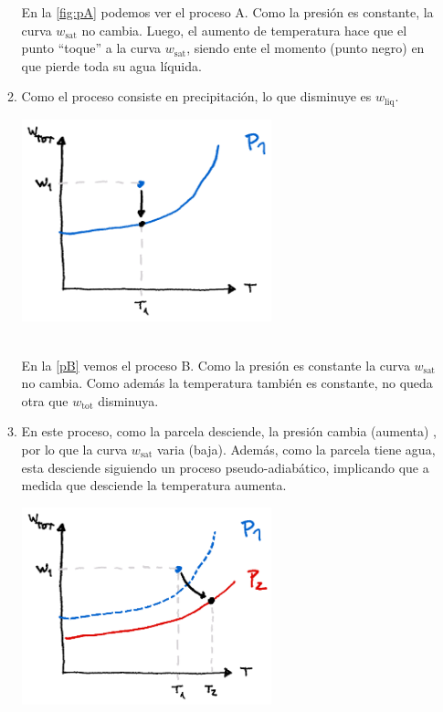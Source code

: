 \documentclass[../main.tex]{subfiles}
\begin{document}
\begin{enumerate}[a)]
\begin{enumerate}
            En la \autoref{fig:pA} podemos ver el proceso A. Como la presión es constante, la curva $w_\text{sat}$ no cambia. Luego, el aumento de temperatura hace que el punto ``toque'' a la curva $w_\text{sat}$, siendo ente el momento (punto negro) en que pierde toda su agua líquida.
            \newpage
        \item Como el proceso consiste en precipitación, lo que disminuye es  $w_\text{liq}$.\par
            \begin{minipage}{\linewidth}
                \centering  
                \includegraphics[width=0.6\textwidth]{img/procesoB}
                \label{pB}
            \end{minipage}\\

            En la \autoref{pB} vemos el proceso B. Como la presión es constante la curva $w_\text{sat}$ no cambia. Como además la temperatura también es constante, no queda otra que $w_\text{tot}$ disminuya. 
        \item En este proceso, como la parcela desciende, la presión cambia (aumenta) , por lo que la curva $w_\text{sat}$ varia (baja). Además, como la parcela tiene agua, esta desciende siguiendo un proceso pseudo-adiabático, implicando que a medida que desciende la temperatura aumenta.\par
\begin{minipage}{\linewidth}
    \centering
    \includegraphics[width=0.6\textwidth]{img/procesoC}
    \label{fig:pC}
\end{minipage}\\


\end{enumerate}
\end{enumerate}
\end{document}
